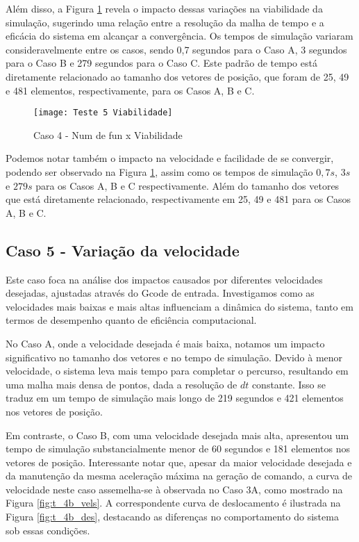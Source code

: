 Além disso, a Figura \ref{fig:t_5_viab} revela o impacto dessas variações na viabilidade da simulação, sugerindo uma relação entre a resolução da malha de tempo e a eficácia do sistema em alcançar a convergência. Os tempos de simulação variaram consideravelmente entre os casos, sendo 0,7 segundos para o Caso A, 3 segundos para o Caso B e 279 segundos para o Caso C. Este padrão de tempo está diretamente relacionado ao tamanho dos vetores de posição, que foram de 25, 49 e 481 elementos, respectivamente, para os Casos A, B e C.

\begin{figure}[H]
    \begin{center}
    \caption{Caso 4 - Num de fun x Viabilidade}
    \texttt{[image: Teste 5 Viabilidade]}
    \label{fig:t_5_viab}
    \end{center}
\end{figure}

Podemos notar também o impacto na velocidade e facilidade de se convergir, podendo ser observado na Figura \ref{fig:t_5_viab}, assim
como os tempos de simulação $0,7 s$, $3 s$ e $279 s$ para os Casos A, B e C respectivamente. Além do tamanho dos vetores que está diretamente relacionado,
respectivamente em 25, 49 e 481 para os Casos A, B e C.
\subsection{Caso 5 - Variação da velocidade}
Este caso foca na análise dos impactos causados por diferentes velocidades desejadas, ajustadas através do Gcode de entrada. Investigamos como as velocidades mais baixas e mais altas influenciam a dinâmica do sistema, tanto em termos de desempenho quanto de eficiência computacional.

No Caso A, onde a velocidade desejada é mais baixa, notamos um impacto significativo no tamanho dos vetores e no tempo de simulação. Devido à menor velocidade, o sistema leva mais tempo para completar o percurso, resultando em uma malha mais densa de pontos, dada a resolução de \(dt\) constante. Isso se traduz em um tempo de simulação mais longo de 219 segundos e 421 elementos nos vetores de posição.

Em contraste, o Caso B, com uma velocidade desejada mais alta, apresentou um tempo de simulação substancialmente menor de 60 segundos e 181 elementos nos vetores de posição. Interessante notar que, apesar da maior velocidade desejada e da manutenção da mesma aceleração máxima na geração de comando, a curva de velocidade neste caso assemelha-se à observada no Caso 3A, como mostrado na Figura \ref{fig:t_4b_vels}. A correspondente curva de deslocamento é ilustrada na Figura \ref{fig:t_4b_des}, destacando as diferenças no comportamento do sistema sob essas condições.


